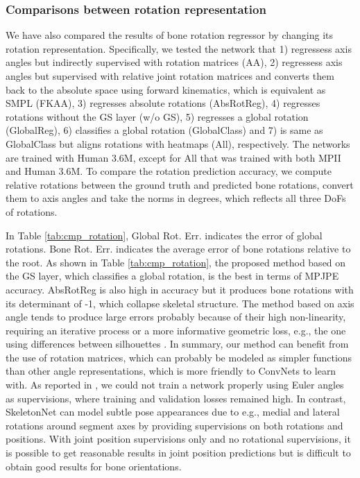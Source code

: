 \subsubsection{Comparisons between rotation representation}
We have also compared the results of bone rotation regressor by changing its rotation representation. Specifically, we tested the network that 1) regressess axis angles but indirectly supervised with rotation matrices (AA), 2) regressess axis angles but supervised with relative joint rotation matrices and converts them back to the absolute space using forward kinematics, which is equivalent as SMPL \cite{bogo2016keep}  (FKAA), 3) regresses absolute rotations (AbsRotReg), 4) regresses rotations without the GS layer (w/o GS), 5) regresses a global rotation (GlobalReg), 6) classifies a global rotation (GlobalClass) and 7) is same as GlobalClass but aligns rotations with heatmaps (All), respectively. The networks are trained with Human 3.6M, except for All that was trained with both MPII and Human 3.6M. To compare the rotation prediction accuracy, we compute relative rotations between the ground truth and predicted bone rotations, convert them to axis angles and take the norms in degrees, which reflects all three DoFs of rotations.


In Table  \ref{tab:cmp_rotation}, Global Rot. Err. indicates the error of global rotations. Bone Rot. Err. indicates the average error of bone rotations relative to the root. As shown in Table \ref{tab:cmp_rotation}, the proposed method based on the GS layer, which  classifies a global rotation, is the best in terms of MPJPE accuracy. AbsRotReg is also high in accuracy but it produces bone rotations with its determinant of -1, which collapse skeletal structure. The method based on axis angle tends to produce large errors probably because of their high non-linearity, requiring an iterative process \cite{hmrKanazawa17} or a more informative geometric loss, e.g., the one using differences between silhouettes \cite{pavlakos2018humanshape}. In summary, our method can benefit from the use of  rotation matrices, which can probably be modeled as simpler functions than other angle representations, which is more friendly to ConvNets to learn with. As reported in \cite{zhou2016deep}, we could not train a network properly using Euler angles as supervisions, where training and validation losses remained high. In contrast, SkeletonNet can model subtle pose appearances due to e.g., medial and lateral rotations around segment axes by providing supervisions on both rotations and positions. With joint position supervisions only and no rotational supervisions, it is possible to get reasonable results in joint position predictions \cite{zhou2016deep} but is difficult to obtain good results for bone orientations.



